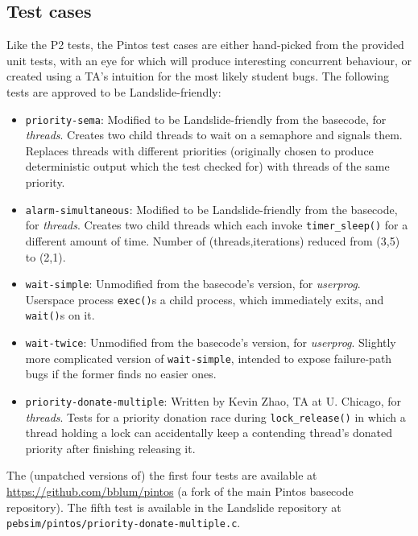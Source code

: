 \subsection{Test cases}
\label{sec:education-pintos-tests}

Like the P2 tests, the Pintos test cases are either hand-picked from the provided unit tests,
with an eye for which will produce interesting concurrent behaviour,
or created using a TA's intuition for the most likely student bugs.
The following tests are approved to be Landslide-friendly:

\begin{itemize}
	\item {\tt priority-sema}:
		Modified to be Landslide-friendly from the basecode, for {\em threads}.
		Creates two child threads to wait on a semaphore and signals them.
		Replaces threads with different priorities
		(originally chosen to produce deterministic output which the test checked for)
		with threads of the same priority.
	\item {\tt alarm-simultaneous}:
		Modified to be Landslide-friendly from the basecode, for {\em threads}.
		Creates two child threads which each invoke {\tt timer\_sleep()} for a different amount of time.
		Number of (threads,iterations) reduced from (3,5) to (2,1).
	\item {\tt wait-simple}:
		Unmodified from the basecode's version, for {\em userprog}.
		Userspace process {\tt exec()}s a child process, which immediately exits, and {\tt wait()}s on it.
	\item {\tt wait-twice}:
		Unmodified from the basecode's version, for {\em userprog}.
		Slightly more complicated version of {\tt wait-simple},
		intended to expose failure-path bugs if the former finds no easier ones.
	\item {\tt priority-donate-multiple}:
		Written by Kevin Zhao, TA at U. Chicago, for {\em threads}.
		Tests for a priority donation race during {\tt lock\_release()}
		in which a thread holding a lock can accidentally keep a contending thread's donated priority
		after finishing releasing it.
\end{itemize}
\vspace{1em}

The (unpatched versions of) the first four tests are available at
\url{https://github.com/bblum/pintos} (a fork of the main Pintos basecode repository).
The fifth test is available in the Landslide repository at {\tt pebsim/pintos/priority-donate-multiple.c}.

